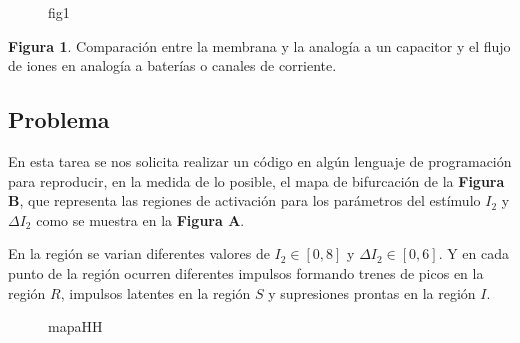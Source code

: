 \documentclass[11pt]{article}
\begin{document}
    \begin{figure}
\centering
{}
\caption{fig1}
\end{figure}

    \textbf{Figura 1}. Comparación entre la membrana y la analogía a un
capacitor y el flujo de iones en analogía a baterías o canales de
corriente.

    \subsection{Problema}\label{problema}

En esta tarea se nos solicita realizar un código en algún lenguaje de
programación para reproducir, en la medida de lo posible, el mapa de
bifurcación de la \textbf{Figura B}, que representa las regiones de
activación para los parámetros del estímulo \(I_2\) y \(\Delta I_2\)
como se muestra en la \textbf{Figura A}.

En la región se varian diferentes valores de \(I_2 \in [0, 8]\) y
\(\Delta I_2 \in [0, 6]\). Y en cada punto de la región ocurren
diferentes impulsos formando trenes de picos en la región \(R\),
impulsos latentes en la región \(S\) y supresiones prontas en la región
\(I\).

    \begin{figure}
\centering
{}
\caption{mapaHH}
\end{figure}
\end{document}
